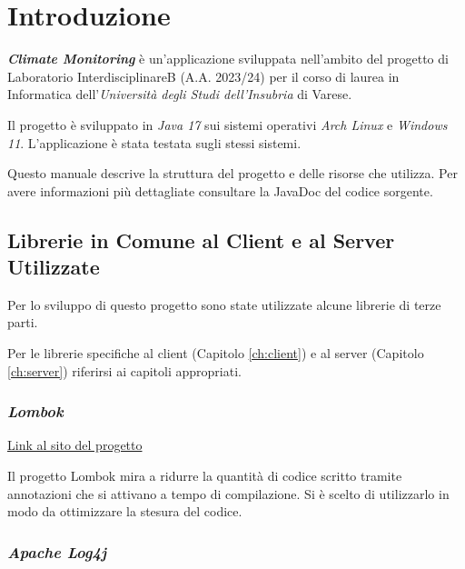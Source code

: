\maketitle

\cleardoublepage
{}
{}
\tableofcontents

\listoffigures

\chapter{Introduzione}
\textsl{\textbf{Climate Monitoring}} è un'applicazione sviluppata nell’ambito del progetto di Laboratorio InterdisciplinareB (A.A. 2023/24) per il corso di laurea in Informatica dell’\textsl{Universit\`a degli Studi dell’Insubria} di Varese.

Il progetto è sviluppato in \textsl{Java 17} sui sistemi operativi \textsl{Arch Linux} e \textsl{Windows 11}.
L'applicazione è stata testata sugli stessi sistemi.

Questo manuale descrive la struttura del progetto e delle risorse che utilizza. Per avere informazioni più dettagliate consultare la JavaDoc del codice sorgente.

\section{Librerie in Comune al Client e al Server Utilizzate}

Per lo sviluppo di questo progetto sono state utilizzate alcune librerie di terze parti.

Per le librerie specifiche al client (Capitolo \ref{ch:client}) e al server (Capitolo \ref{ch:server}) riferirsi ai capitoli appropriati.

\subsection{\textsl{Lombok}}

\href{https://projectlombok.org/}{Link al sito del progetto}

Il progetto Lombok mira a ridurre la quantità di codice scritto tramite annotazioni che si attivano a tempo di compilazione. Si è scelto di utilizzarlo in modo da ottimizzare la stesura del codice.

\subsection{\textsl{Apache Log4j}}

